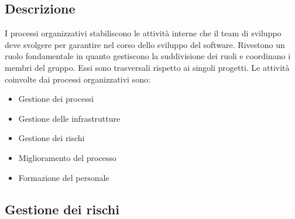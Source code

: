 \documentclass[../norme-di-progetto.tex]{subfiles}
\begin{document}
\subsection{Descrizione}
\label{sub:Descrizione}
I processi organizzativi stabiliscono le attività interne che il team di sviluppo deve svolgere per garantire  nel corso dello sviluppo del software. Rivestono un ruolo fondamentale in quanto gestiscono la suddivisione dei ruoli e coordinano i membri del gruppo. Essi sono trasversali rispetto ai singoli progetti.
Le attività coinvolte dai processi organizzativi sono:
\begin{itemize}
	\item Gestione dei processi
	\item Gestione delle infrastrutture
	\item Gestione dei rischi
	\item Miglioramento del processo
	\item Formazione del personale
\end{itemize}
\subsection{Gestione dei rischi}
\label{sub:gestione dei rischi}
\end{document}
